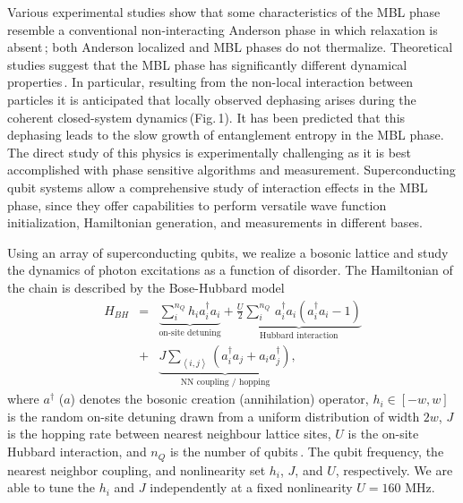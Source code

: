 Various experimental studies show that some characteristics of the MBL phase resemble a conventional non-interacting Anderson phase in which relaxation is absent\,\cite{BlochMBL2015, demarco2015, Monroe2015, GrossScience2016, Bordia2017, Roushan2018, Lukin2019}; both Anderson localized and MBL phases do not thermalize. Theoretical studies suggest that the MBL phase has significantly different dynamical properties\,\cite{Huse2007, Bardarson2012, Serbyn2013b, Huse2014, Serbyn2013, KnapPRL2014, Antonello2017, Serbyn2014, Yasaman2015,  Gopalakrishnan2015, Serbyn2015, Altman2015, ImbriePRL2016}. In particular, resulting from the non-local interaction between particles it is anticipated that locally observed dephasing arises during the coherent closed-system dynamics\,(Fig.\,1). It has been predicted that this dephasing leads to the slow growth of entanglement entropy in the MBL phase. The direct study of this physics is experimentally challenging as it is best accomplished with phase sensitive algorithms and measurement. Superconducting qubit systems allow a comprehensive study of interaction effects in the MBL phase, since they offer capabilities to perform versatile wave function initialization, Hamiltonian generation, and measurements in different bases.

Using an array of superconducting qubits, we realize a bosonic lattice and study the dynamics of photon excitations as a function of disorder. The Hamiltonian of the chain is described by the Bose-Hubbard model
\begin{eqnarray}
H_{BH} &=& \underbrace{\sum\limits_{i}^{n_Q} h_i a^{\dagger}_{i}a_{i}}_{\text{on-site detuning}} +
\underbrace{\frac{U}{2}\sum\limits_{i}^{n_Q} \,a^{\dagger}_{i}a_i(a^{\dagger}_{i}a_i-1)}_{\text{Hubbard interaction}} \nonumber \\
&+& \underbrace{J \sum_{\left< i, j \right>}\left( a^{\dagger}_{i}a_j+a_{i}a^{\dagger}_{j} \right) }_{\text{NN coupling / hopping}},
\end{eqnarray}
\noindent
where $a^{\dagger}$ ($a$) denotes the bosonic creation (annihilation) operator, $h_i\in \left[ -w, w \right]$ is the random on-site detuning drawn from a uniform distribution of width $2w$, $J$ is the hopping rate between nearest neighbour lattice sites, $U$ is the on-site Hubbard interaction, and $n_Q$ is the number of qubits\,\cite{supplement}. The qubit frequency, the nearest neighbor coupling, and nonlinearity set $h_i$, $J$, and $U$, respectively. We are able to tune the $h_i$ and $J$ independently at a fixed nonlinearity $U=160$ MHz.

